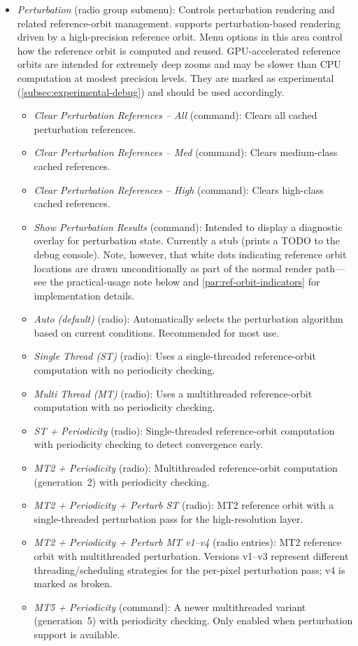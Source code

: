 \begin{itemize}
  \item \emph{Perturbation} (radio group submenu): Controls perturbation
    rendering and related reference-orbit management.  \FractalShark{} supports
    perturbation-based rendering driven by a high-precision reference orbit.
    Menu options in this area control how the reference orbit is computed and
    reused.  GPU-accelerated reference orbits are intended for extremely deep
    zooms and may be slower than CPU computation at modest precision levels.
    They are marked as experimental (\cref{subsec:experimental-debug}) and
    should be used accordingly.
    \begin{itemize}
      \item \emph{Clear Perturbation References -- All} (command): Clears all cached perturbation references.
      \item \emph{Clear Perturbation References -- Med} (command): Clears medium-class cached references.
      \item \emph{Clear Perturbation References -- High} (command): Clears high-class cached references.
      \item \emph{Show Perturbation Results} (command): Intended to display
      a diagnostic overlay for perturbation state.  Currently a stub
      (prints a TODO to the debug console).  Note, however, that white
      dots indicating reference orbit locations are drawn unconditionally
      as part of the normal render path---see the practical-usage note
      below and \cref{par:ref-orbit-indicators} for implementation
      details.

      \item \emph{Auto (default)} (radio): Automatically selects the perturbation
      algorithm based on current conditions.  Recommended for most use.
      \item \emph{Single Thread (ST)} (radio): Uses a single-threaded
      reference-orbit computation with no periodicity checking.
      \item \emph{Multi Thread (MT)} (radio): Uses a multithreaded
      reference-orbit computation with no periodicity checking.
      \item \emph{ST + Periodicity} (radio): Single-threaded reference-orbit
      computation with periodicity checking to detect convergence early.
      \item \emph{MT2 + Periodicity} (radio): Multithreaded reference-orbit
      computation (generation~2) with periodicity checking.
      \item \emph{MT2 + Periodicity + Perturb ST} (radio): MT2 reference orbit
      with a single-threaded perturbation pass for the high-resolution layer.
      \item \emph{MT2 + Periodicity + Perturb MT v1--v4} (radio entries):
      MT2 reference orbit with multithreaded perturbation.  Versions v1--v3
      represent different threading/scheduling strategies for the per-pixel
      perturbation pass; v4 is marked as broken.
      \item \emph{MT5 + Periodicity} (command): A newer multithreaded variant
      (generation~5) with periodicity checking.  Only enabled when perturbation
      support is available.


\end{itemize}
\end{itemize}

